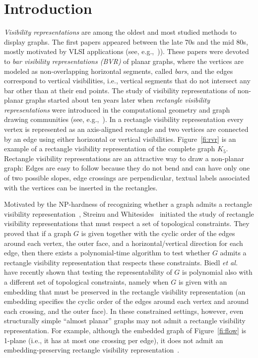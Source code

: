 \documentclass{article}
\begin{document}
\section{Introduction}

\emph{Visibility representations} are among the oldest and most studied methods to display graphs. The first papers appeared between the late 70s and the mid 80s, mostly motivated by VLSI applications (see, e.g.,~\cite{Duchet1983319,ov-grild-78,DBLP:journals/dcg/RosenstiehlT86,TamassiaTollis86,t-prg-84,DBLP:conf/compgeom/Wismath85})). These papers were devoted to \emph{bar visibility representations (BVR)} of planar graphs, where the vertices are modeled as non-overlapping horizontal segments, called \emph{bars}, and the edges correspond to vertical visibilities, i.e., vertical segments that do not intersect any bar other than at their end points.
The study of  visibility  representations of non-planar graphs started about ten years later when \emph{rectangle visibility representations} were introduced in the computational geometry and graph drawing communities (see, e.g.,~\cite{DBLP:journals/dam/DeanH97,DBLP:journals/comgeo/HutchinsonSV99,DBLP:journals/ipl/KantLTT97,DBLP:conf/cccg/Shermer96}). In a rectangle visibility representation every vertex is represented as an axis-aligned rectangle and two vertices are connected by an edge using either horizontal or vertical visibilities. Figure~\ref{fi:rvr} is an example of a rectangle visibility representation of the complete graph $K_5$. Rectangle visibility representations are an attractive way to draw a non-planar graph: Edges are easy to follow because they do not bend and can have only one of two possible slopes, edge crossings are perpendicular, textual labels associated with the vertices can be inserted in the rectangles.


Motivated by the NP-hardness of recognizing whether a graph admits a rectangle visibility representation~\cite{DBLP:conf/cccg/Shermer96}, Streinu and Whitesides~\cite{DBLP:conf/stacs/StreinuW03} initiated the study of rectangle visibility representations that must respect a set of topological constraints. They proved that if a graph $G$ is given together with the cyclic order of the edges around each vertex, the outer face, and a horizontal/vertical direction for each edge, then there exists a polynomial-time algorithm to test whether $G$ admits a rectangle visibility representation that respects these constraints. Biedl {\em et al.}~\cite{SoCG} have recently shown that testing the representability of $G$ is polynomial also with a different set of topological constraints, namely when $G$ is given with an embedding  that must be preserved in the rectangle visibility representation (an embedding specifies the cyclic order of the edges around each vertex and around each crossing, and the outer face). In these constrained settings, however, even structurally simple ``almost planar'' graphs may not admit a  rectangle visibility representation. For example, although the embedded graph of Figure~\ref{fi:flow} is 1-plane (i.e., it has at most one crossing per edge), it does not admit an embedding-preserving rectangle visibility representation~\cite{SoCG}.
\end{document}
